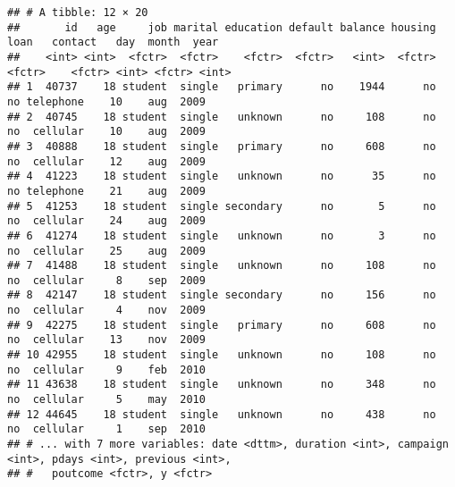 \documentclass[]{book}
\newenvironment{Shaded}{\begin{snugshade}}{\end{snugshade}}
\newcommand{\KeywordTok}[1]{\textcolor[rgb]{0.13,0.29,0.53}{\textbf{{#1}}}}
\newcommand{\DecValTok}[1]{\textcolor[rgb]{0.00,0.00,0.81}{{#1}}}
\newcommand{\StringTok}[1]{\textcolor[rgb]{0.31,0.60,0.02}{{#1}}}
\newcommand{\CommentTok}[1]{\textcolor[rgb]{0.56,0.35,0.01}{\textit{{#1}}}}
\newcommand{\NormalTok}[1]{{#1}}
\begin{document}
\begin{verbatim}
## # A tibble: 12 × 20
##       id   age     job marital education default balance housing   loan   contact   day  month  year
##    <int> <int>  <fctr>  <fctr>    <fctr>  <fctr>   <int>  <fctr> <fctr>    <fctr> <int> <fctr> <int>
## 1  40737    18 student  single   primary      no    1944      no     no telephone    10    aug  2009
## 2  40745    18 student  single   unknown      no     108      no     no  cellular    10    aug  2009
## 3  40888    18 student  single   primary      no     608      no     no  cellular    12    aug  2009
## 4  41223    18 student  single   unknown      no      35      no     no telephone    21    aug  2009
## 5  41253    18 student  single secondary      no       5      no     no  cellular    24    aug  2009
## 6  41274    18 student  single   unknown      no       3      no     no  cellular    25    aug  2009
## 7  41488    18 student  single   unknown      no     108      no     no  cellular     8    sep  2009
## 8  42147    18 student  single secondary      no     156      no     no  cellular     4    nov  2009
## 9  42275    18 student  single   primary      no     608      no     no  cellular    13    nov  2009
## 10 42955    18 student  single   unknown      no     108      no     no  cellular     9    feb  2010
## 11 43638    18 student  single   unknown      no     348      no     no  cellular     5    may  2010
## 12 44645    18 student  single   unknown      no     438      no     no  cellular     1    sep  2010
## # ... with 7 more variables: date <dttm>, duration <int>, campaign <int>, pdays <int>, previous <int>,
## #   poutcome <fctr>, y <fctr>
\end{verbatim}

\begin{Shaded}
\end{Shaded}
\end{document}
